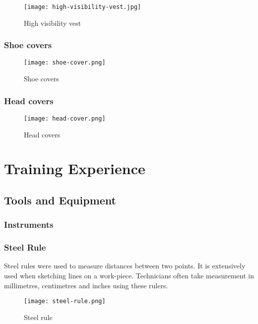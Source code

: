 \documentclass[a4paper,12pt]{article}
\begin{document}
						\begin{figure}[H]
							\centering				
								\texttt{[image: high-visibility-vest.jpg]}
							\caption{High visibility vest}
							\label{fig:high-visibility-vest}
						\end{figure}
						
					\subsubsection*{Shoe covers}
					
						\begin{figure}[H]
							\centering				
								\texttt{[image: shoe-cover.png]}
							\caption{Shoe covers}
							\label{fig:shoe-covers}
						\end{figure}
						
					\subsubsection*{Head covers}
					
						\begin{figure}[H]
							\centering				
								\texttt{[image: head-cover.png]}
							\caption{Head covers}
							\label{fig:head-covers}
						\end{figure}				
						
\newpage
\section{Training Experience}
		\subsection{Tools and Equipment}
			\subsubsection{Instruments}
				\subsubsection*{Steel Rule}
					Steel rules were used to measure distances between two points.
					It is extensively used when sketching lines on a work-piece.
					Technicians often take measurement in millimetres, centimetres and inches using these rulers. 
						\begin{figure}[H]
							\centering		
							\texttt{[image: steel-rule.png]}		
							\caption{Steel rule}
							\label{fig:steel-rule}
						\end{figure}
						
\end{document}
